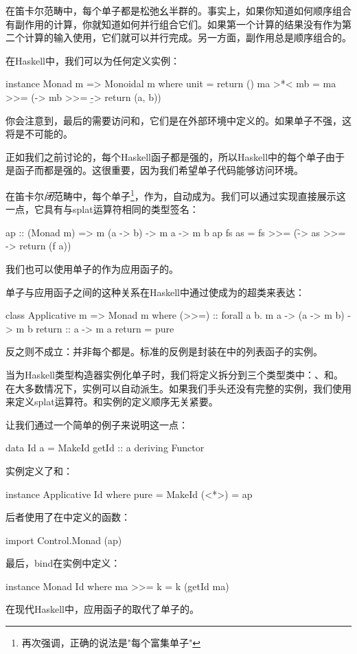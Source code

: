 \documentclass[DaoFP]{subfiles}
\begin{document}
在笛卡尔范畴中，每个单子都是松弛幺半群的。事实上，如果你知道如何顺序组合有副作用的计算，你就知道如何并行组合它们。如果第一个计算的结果没有作为第二个计算的输入使用，它们就可以并行完成。另一方面，副作用总是顺序组合的。

在Haskell中，我们可以为任何定义实例：
\begin{haskell}
instance Monad m => Monoidal m where
    unit = return ()
    ma >*< mb = ma >>= 
         (\a -> mb >>= 
             \b -> return (a, b))
\end{haskell}
你会注意到，最后的需要访问和，它们是在外部环境中定义的。如果单子不强，这将是不可能的。

正如我们之前讨论的，每个Haskell函子都是强的，所以Haskell中的每个单子由于是函子而都是强的。这很重要，因为我们希望单子代码能够访问环境。

在笛卡尔\emph{闭}范畴中，每个单子\footnote{再次强调，正确的说法是"每个富集单子"}，作为，自动成为。我们可以通过实现直接展示这一点，它具有与splat运算符相同的类型签名：
\begin{haskell}
ap :: (Monad m) => m (a -> b) -> m a -> m b
ap fs as = fs >>= 
    (\f -> as >>= 
        \a -> return (f a))
\end{haskell}
我们也可以使用单子的作为应用函子的。

单子与应用函子之间的这种关系在Haskell中通过使成为的超类来表达：
\begin{haskell}
class Applicative m => Monad m where
    (>>=)       :: forall a b. m a -> (a -> m b) -> m b
    return      :: a -> m a
    return      = pure
\end{haskell}

反之则不成立：并非每个都是。标准的反例是封装在中的列表函子的实例。

当为Haskell类型构造器实例化单子时，我们将定义拆分到三个类型类中：、和。在大多数情况下，实例可以自动派生。如果我们手头还没有完整的实例，我们使用来定义splat运算符。和实例的定义顺序无关紧要。

让我们通过一个简单的例子来说明这一点：
\begin{haskell}
data Id a = MakeId { getId :: a }
    deriving Functor
\end{haskell}
实例定义了和\hask{<*>}：
\begin{haskell}
instance Applicative Id where
    pure = MakeId 
    (<*>) = ap
\end{haskell}
后者使用了在中定义的函数：
\begin{haskell}
import Control.Monad (ap)
\end{haskell}
最后，bind在实例中定义：
\begin{haskell}
instance Monad Id where
    ma >>= k = k (getId ma)
\end{haskell}
在现代Haskell中，应用函子的取代了单子的。
\end{document}
